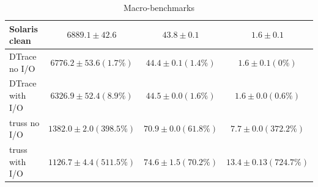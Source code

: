 \begin{table}[ht]
{\begin{tabular}{|l|c|c|c|}
\hline
\hline
Solaris clean & \begin{math} 6889.1\pm42.6 \end{math} & \begin{math} 43.8\pm0.1 \end{math} & \begin{math} 1.6\pm0.1 \end{math} \\
\hline
DTrace no I/O & \begin{math} 6776.2\pm53.6 (1.7\%) \end{math} & \begin{math} 44.4\pm0.1 (1.4\%) \end{math} & \begin{math} 1.6\pm0.1 (0\%) \end{math} \\
DTrace with I/O & \begin{math} 6326.9\pm52.4 (8.9\%) \end{math} & \begin{math} 44.5\pm0.0 (1.6\%) \end{math} & \begin{math} 1.6\pm0.0 (0.6\%) \end{math} \\
truss no I/O & \begin{math} 1382.0\pm2.0 (398.5\%) \end{math} & \begin{math} 70.9\pm0.0 (61.8\%) \end{math} & \begin{math} 7.7\pm0.0 (372.2\%) \end{math} \\
truss with I/O & \begin{math} 1126.7\pm4.4 (511.5\%) \end{math} & \begin{math} 74.6\pm1.5 (70.2\%) \end{math} & \begin{math} 13.4\pm0.13 (724.7\%) \end{math} \\
\hline
\end{tabular}}
\caption{Macro-benchmarks}
\label{tab:lbox-macro}
\end{table}

